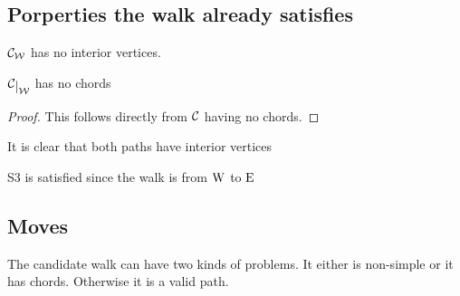 \subsection{Porperties the walk already satisfies}

\begin{lemma}
$\mathcal{C}_{\mathcal{W}}$ has no interior vertices.
\end{lemma}

\begin{lemma}
$\restC\W$ has no chords
\end{lemma}
\begin{proof}
This follows directly from $\mathcal{C}$ having no chords.
\end{proof}

It is clear that both paths have interior vertices

\begin{lemma}
S3 is satisfied since the walk is from $\mathrm{W}$ to $\mathrm{E}$
\end{lemma}

\subsection{Moves}

The candidate walk can have two kinds of problems. It either is non-simple or it has chords. Otherwise it is a valid path.



